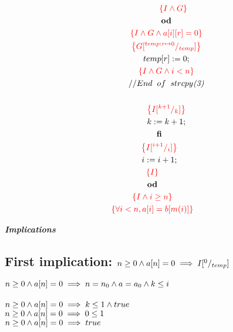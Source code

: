 \documentclass [a4paper, 12pt, fleqn]  {article}
\newcommand{\assn}[1]{{\color{red}\left\{#1\right\}}}
\newcommand{\remark}[1]{{\sffamily\color{blue}{#1}}}
\begin{document}
\begin{gather*}
\hspace{1.2cm} \hspace{0.6cm} \assn{I \AND G} \\
\hspace{1.2cm} \OD \\
\hspace{1.2cm} \assn{I \AND G \AND a[i][r] = 0} \\
\hspace{1.2cm} \assn{G \subst {temp: r \mapsto 0}  {temp}  } \\
\hspace{1.2cm} temp[r] \Ass 0; \\
\hspace{1.2cm} \assn{I \AND G \AND i < n} \\
\hspace{1.2cm} //End \hspace{0.2cm} of \hspace{0.2cm} strcpy \textit{(3)} \\ \\ %
\hspace{1.2cm} \assn{  I \subst {k + 1} k } \\
\hspace{1.2cm} k \Ass k + 1; \\
\hspace{0.6cm} \FI \\
\hspace{0.6cm} \assn{  I \subst {i + 1 } i } \\
\hspace{0.6cm} i \Ass i + 1; \\
\assn{  I } \\
\OD \\
\assn {  I \AND i \geq n   } \\
\assn {  \forall i < n, a[i] = b[m(i)]  } \\
\end{gather*}
\newpage

\textit{\textbf{Implications}} \\
\subsection{First implication: $ n \geq 0 \wedge a[n] = 0 \implies I [^{0}/_{temp}]   $} 
 $ n \geq 0 \wedge a[n] = 0 \implies n = n_0 \wedge a = a_0 \wedge k \leq i $ \\
\remark{ n and a have not been changed thus far in the program, as such they can be assumed true} \\
$ n \geq 0 \wedge a[n] = 0 \implies k \leq 1 \wedge true $ \\
$ n \geq 0 \wedge a[n] = 0 \implies 0 \leq 1 $ \\
$ n \geq 0 \wedge a[n] = 0 \implies true $ \\
\remark{ Therefore, implication is proved true} \\
\end{document}
